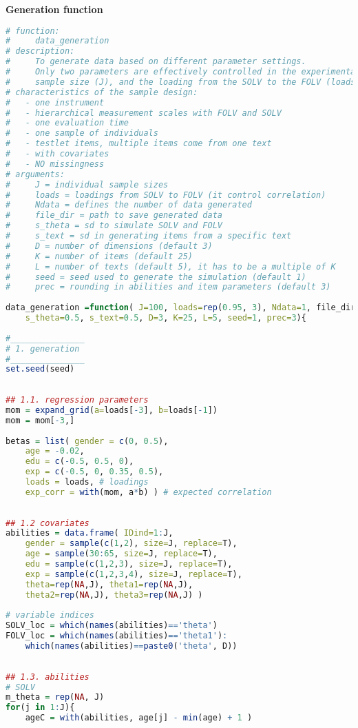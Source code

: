 \noindent \textbf{Generation function}
%
\begin{lstlisting}[language=R]
# function:
#     data_generation
# description:  
#     To generate data based on different parameter settings.
#     Only two parameters are effectively controlled in the experimentation: 
#     sample size (J), and the loading from the SOLV to the FOLV (loads).
# characteristics of the sample design:
#   - one instrument
#   - hierarchical measurement scales with FOLV and SOLV
#   - one evaluation time
#   - one sample of individuals
#   - testlet items, multiple items come from one text
#   - with covariates
#   - NO missingness
# arguments:
#     J = individual sample sizes
#     loads = loadings from SOLV to FOLV (it control correlation)
#     Ndata = defines the number of data generated
#     file_dir = path to save generated data
#     s_theta = sd to simulate SOLV and FOLV
#     s_text = sd in generating items from a specific text
#     D = number of dimensions (default 3)
#     K = number of items (default 25)
#     L = number of texts (default 5), it has to be a multiple of K
#     seed = seed used to generate the simulation (default 1)
#     prec = rounding in abilities and item parameters (default 3)
	
data_generation =function( J=100, loads=rep(0.95, 3), Ndata=1, file_dir,
	s_theta=0.5, s_text=0.5, D=3, K=25, L=5, seed=1, prec=3){
		
#_______________
# 1. generation 
#_______________
set.seed(seed)
		
	
## 1.1. regression parameters
mom = expand_grid(a=loads[-3], b=loads[-1])
mom = mom[-3,]
		
betas = list( gender = c(0, 0.5),
	age = -0.02,
	edu = c(-0.5, 0.5, 0),
	exp = c(-0.5, 0, 0.35, 0.5),
	loads = loads, # loadings
	exp_corr = with(mom, a*b) ) # expected correlation
		
		
## 1.2 covariates
abilities = data.frame( IDind=1:J,
	gender = sample(c(1,2), size=J, replace=T),
	age = sample(30:65, size=J, replace=T),
	edu = sample(c(1,2,3), size=J, replace=T),
	exp = sample(c(1,2,3,4), size=J, replace=T),
	theta=rep(NA,J), theta1=rep(NA,J), 
	theta2=rep(NA,J), theta3=rep(NA,J) )
	
# variable indices
SOLV_loc = which(names(abilities)=='theta')
FOLV_loc = which(names(abilities)=='theta1'):
	which(names(abilities)==paste0('theta', D))
		
		
## 1.3. abilities
# SOLV
m_theta = rep(NA, J)
for(j in 1:J){
	ageC = with(abilities, age[j] - min(age) + 1 )
	

\end{lstlisting}
